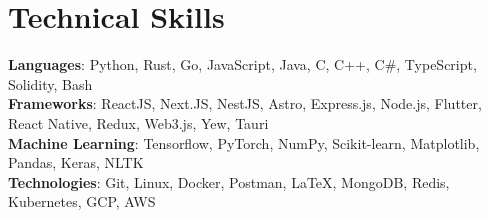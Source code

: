 %
\section{Technical Skills}
 \begin{itemize}[leftmargin=0.15in,label={}]
    \small{\item{
     \textbf{Languages}{: Python, Rust, Go, JavaScript, Java, C, C++, C\#, TypeScript, Solidity, Bash} \\
     \textbf{Frameworks}{: ReactJS, Next.JS, NestJS, Astro, Express.js, Node.js, Flutter, React Native, Redux, Web3.js, Yew, Tauri} \\
     \textbf{Machine Learning}{: Tensorflow, PyTorch, NumPy, Scikit-learn, Matplotlib, Pandas, Keras, NLTK} \\
     \textbf{Technologies}{: Git, Linux, Docker, Postman, \LaTeX, MongoDB, Redis, Kubernetes, GCP, AWS } \\
    }}
 \end{itemize}
 \vspace{-16pt}
